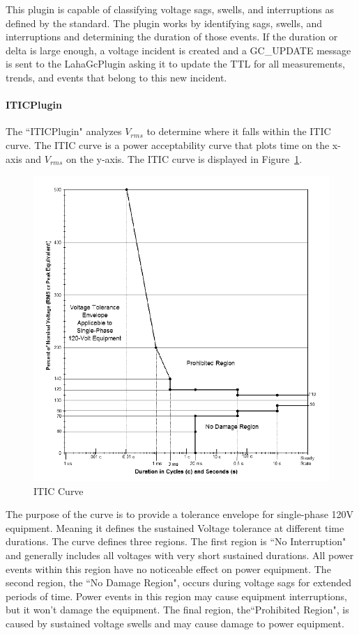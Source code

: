This plugin is capable of classifying voltage sags, swells, and interruptions as defined by the standard. The plugin works by identifying sags, swells, and interruptions and determining the duration of those events. If the duration or delta is large enough, a voltage incident is created and a GC\_UPDATE message is sent to the LahaGcPlugin asking it to update the TTL for all measurements, trends, and events that belong to this new incident.

\paragraph{ITICPlugin}
The ``ITICPlugin" analyzes $V_{rms}$ to determine where it falls within the ITIC curve\cite{thallam2000power}. The ITIC curve is a power acceptability curve that plots time on the x-axis and $V_{rms}$ on the y-axis. The ITIC curve is displayed in Figure~\ref{fig:IticCurve}.

\begin{figure}
	\centering
	\includegraphics[width=\linewidth]{figures/itic.png}
	\caption{ITIC Curve}
	\label{fig:IticCurve}
\end{figure}

The purpose of the curve is to provide a tolerance envelope for single-phase 120V equipment. Meaning it defines the sustained Voltage tolerance at different time durations. The curve defines three regions. The first region is ``No Interruption" and generally includes all voltages with very short sustained durations. All power events within this region have no noticeable effect on power equipment. The second region, the ``No Damage Region", occurs during voltage sags for extended periods of time. Power events in this region may cause equipment interruptions, but it won't damage the equipment. The final region, the``Prohibited Region", is caused by sustained voltage swells and may cause damage to power equipment.

